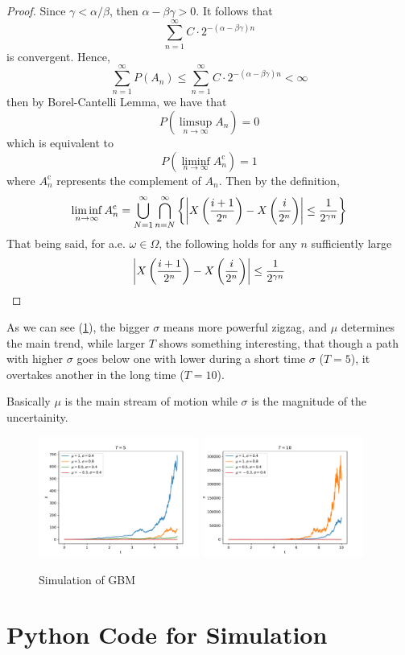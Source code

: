 \documentclass{homework}
\begin{document}
\begin{subproblem}
        \item
        \begin{proof}
            Since $\gamma<\alpha/\beta$, then $\alpha-\beta\gamma>0$.
            It follows that
            \[\sum_{n=1}^\infty C\cdot 2^{-(\alpha-\beta\gamma)n}\]
            is convergent. Hence,
            \[\sum_{n=1}^\infty P(A_n)
            \leq\sum_{n=1}^\infty C\cdot 2^{-(\alpha-\beta\gamma)n}
            <\infty\]
            then by Borel-Cantelli Lemma, we have that
            \[P\left(\limsup_{n\to\infty}A_n\right)=0\]
            which is equivalent to
            \[P\left(\liminf_{n\to\infty}A_n^\mathrm c\right)=1\]
            where $A_n^\mathrm c$ represents the complement of $A_n$.
            Then by the definition,
            \[\liminf_{n\to\infty}A_n^\mathrm c
            =\bigcup_{N=1}^\infty\bigcap_{n=N}^\infty
            \left\{\left|X\left(\frac{i+1}{2^n}\right)-X\left(\frac{i}{2^n}\right)\right|\leq\frac{1}{2^{\gamma n}}\right\}\]
            That being said, for a.e. $\omega\in\Omega$, the following
            holds for any $n$ sufficiently large
            \[\left|X\left(\frac{i+1}{2^n}\right)-X\left(\frac{i}{2^n}\right)\right|\leq\frac{1}{2^{\gamma n}}\]
        \end{proof}
    \end{subproblem}

    \problem
    As we can see (\cref{fig:simulation}), the bigger $\sigma$ means more
    powerful zigzag, and $\mu$ determines the main trend,
    while larger $T$ shows something interesting, that though
    a path with higher $\sigma$ goes below one with lower
    during a short time $\sigma$ ($T=5$),
    it overtakes another in the long time ($T=10$).

    Basically $\mu$ is the main stream of motion while
    $\sigma$ is the magnitude of the uncertainity.

    \begin{figure}
        \centering
        \includegraphics[width=0.47\textwidth]{T=5}
        \includegraphics[width=0.47\textwidth]{T=10}
        \caption{Simulation of GBM}
        \label{fig:simulation}
    \end{figure}

    \appendix
    \section{Python Code for Simulation}
    \begin{fullwidth}
    
    \end{fullwidth}
\end{document}
